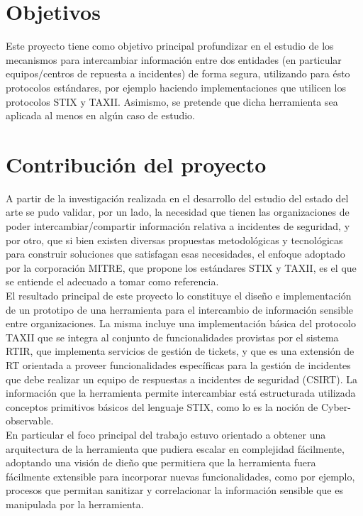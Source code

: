 \section{Objetivos}
\label{capitulo1:objetivos}
Este proyecto tiene como objetivo principal profundizar en el estudio de los mecanismos para intercambiar información entre dos entidades (en particular equipos/centros de repuesta a incidentes) de forma segura, utilizando para ésto protocolos estándares, por ejemplo haciendo implementaciones que utilicen los protocolos STIX y TAXII. Asimismo, se pretende que dicha herramienta sea aplicada al menos en algún caso de estudio.


\section{Contribución del proyecto}
\label{capitulo1:contribucion}

A partir de la investigación realizada en el desarrollo del estudio del estado del arte se pudo validar, por un lado, la necesidad que tienen las organizaciones de poder intercambiar/compartir información relativa a incidentes de seguridad, y por otro, que si bien existen diversas propuestas metodológicas y tecnológicas para construir soluciones que satisfagan esas necesidades, el enfoque adoptado por la corporación MITRE, que propone los estándares STIX y TAXII,  es el que se entiende el adecuado a tomar como referencia. \\

El resultado principal de este proyecto lo constituye el diseño e implementación de un prototipo de una herramienta para el intercambio de información sensible entre organizaciones. La misma incluye una implementación básica del protocolo TAXII que se integra al conjunto de funcionalidades provistas por el sistema RTIR, que implementa servicios de gestión de tickets, y que es una extensión de RT orientada a proveer funcionalidades específicas para la gestión de incidentes que debe realizar un equipo de respuestas a incidentes de seguridad (CSIRT). La información que la herramienta permite  intercambiar está estructurada utilizada conceptos primitivos básicos del lenguaje STIX, como lo es la noción de Cyber-observable.\\

En particular el foco principal del trabajo estuvo orientado a obtener una arquitectura de la herramienta que pudiera escalar en complejidad fácilmente, adoptando una visión de dieño que permitiera que la herramienta fuera fácilmente extensible para incorporar nuevas funcionalidades, como por ejemplo, procesos que permitan sanitizar y correlacionar la información sensible que es manipulada por la herramienta.

